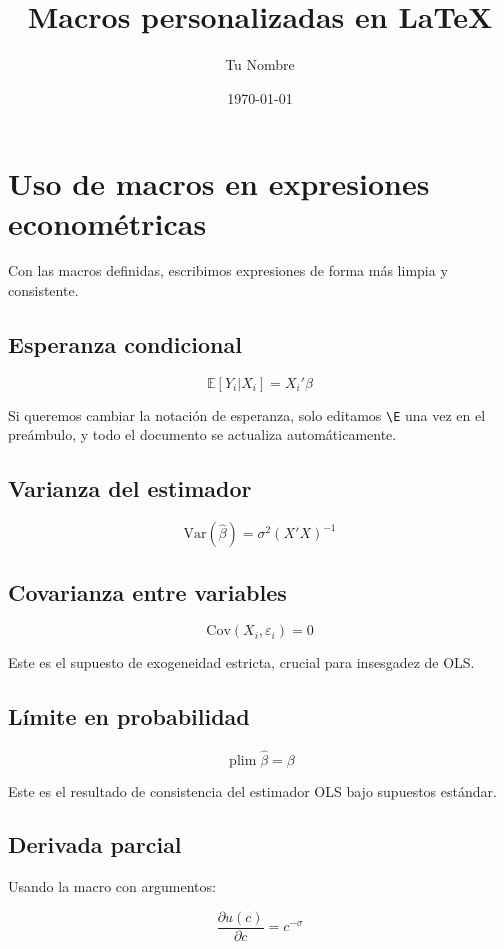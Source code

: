 \documentclass[12pt, a4paper]{article}
\title{Macros personalizadas en \LaTeX{}}
\author{Tu Nombre}
\date{\today}
\newcommand{\E}{\mathbb{E}}
\newcommand{\Var}{\mathrm{Var}}
\newcommand{\Cov}{\mathrm{Cov}}
\newcommand{\plim}{\operatorname{plim}}
\newcommand{\deriv}[2]{\frac{\partial #1}{\partial #2}}
\begin{document}
\maketitle

\section{Uso de macros en expresiones econométricas}

Con las macros definidas, escribimos expresiones de forma más limpia y consistente.

\subsection{Esperanza condicional}

\[
  \E[Y_i | X_i] = X_i'\beta
\]

Si queremos cambiar la notación de esperanza, solo editamos \verb|\E| una vez 
en el preámbulo, y todo el documento se actualiza automáticamente.

\subsection{Varianza del estimador}

\[
  \Var(\hat{\beta}) = \sigma^2(X'X)^{-1}
\]

\subsection{Covarianza entre variables}

\[
  \Cov(X_i, \varepsilon_i) = 0
\]

Este es el supuesto de exogeneidad estricta, crucial para insesgadez de OLS.

\subsection{Límite en probabilidad}

\[
  \plim \hat{\beta} = \beta
\]

Este es el resultado de consistencia del estimador OLS bajo supuestos estándar.

\subsection{Derivada parcial}

Usando la macro con argumentos:

\[
  \deriv{u(c)}{c} = c^{-\sigma}
\]
\end{document}
